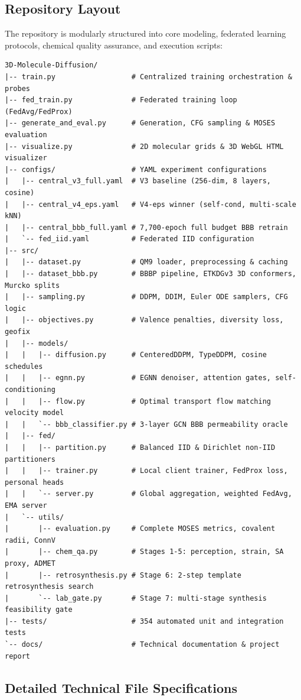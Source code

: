 \documentclass[12pt, a4paper]{article}
\begin{document}
\subsection{Repository Layout}
The repository is modularly structured into core modeling, federated learning protocols, chemical quality assurance, and execution scripts:
\begin{lstlisting}[language={}, caption={Repository layout of the 3D-Molecule-Diffusion codebase.}]
3D-Molecule-Diffusion/
|-- train.py                  # Centralized training orchestration & probes
|-- fed_train.py              # Federated training loop (FedAvg/FedProx)
|-- generate_and_eval.py      # Generation, CFG sampling & MOSES evaluation
|-- visualize.py              # 2D molecular grids & 3D WebGL HTML visualizer
|-- configs/                  # YAML experiment configurations
|   |-- central_v3_full.yaml  # V3 baseline (256-dim, 8 layers, cosine)
|   |-- central_v4_eps.yaml   # V4-eps winner (self-cond, multi-scale kNN)
|   |-- central_bbb_full.yaml # 7,700-epoch full budget BBB retrain
|   `-- fed_iid.yaml          # Federated IID configuration
|-- src/
|   |-- dataset.py            # QM9 loader, preprocessing & caching
|   |-- dataset_bbb.py        # BBBP pipeline, ETKDGv3 3D conformers, Murcko splits
|   |-- sampling.py           # DDPM, DDIM, Euler ODE samplers, CFG logic
|   |-- objectives.py         # Valence penalties, diversity loss, geofix
|   |-- models/
|   |   |-- diffusion.py      # CenteredDDPM, TypeDDPM, cosine schedules
|   |   |-- egnn.py           # EGNN denoiser, attention gates, self-conditioning
|   |   |-- flow.py           # Optimal transport flow matching velocity model
|   |   `-- bbb_classifier.py # 3-layer GCN BBB permeability oracle
|   |-- fed/
|   |   |-- partition.py      # Balanced IID & Dirichlet non-IID partitioners
|   |   |-- trainer.py        # Local client trainer, FedProx loss, personal heads
|   |   `-- server.py         # Global aggregation, weighted FedAvg, EMA server
|   `-- utils/
|       |-- evaluation.py     # Complete MOSES metrics, covalent radii, ConnV
|       |-- chem_qa.py        # Stages 1-5: perception, strain, SA proxy, ADMET
|       |-- retrosynthesis.py # Stage 6: 2-step template retrosynthesis search
|       `-- lab_gate.py       # Stage 7: multi-stage synthesis feasibility gate
|-- tests/                    # 354 automated unit and integration tests
`-- docs/                     # Technical documentation & project report
\end{lstlisting}

\subsection{Detailed Technical File Specifications}
\end{document}
